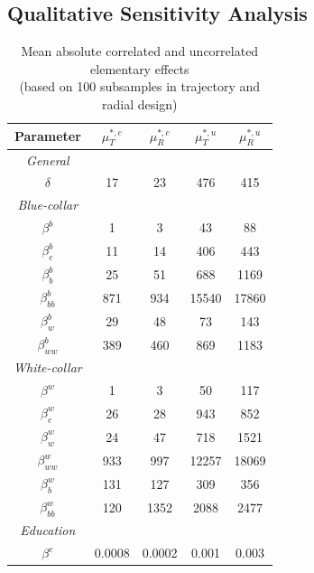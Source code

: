 \documentclass[a4paper,12pt]{article}
\begin{document}
\subsection{Qualitative Sensitivity Analysis}
\newpage
\setlength{\tabcolsep}{22pt} %
\begin{table}[H] 
	\centering
	\begin{threeparttable}
		\caption[Model Parametrization]{Mean absolute correlated and uncorrelated elementary effects\\ (based on 100 subsamples in trajectory and radial design)}
		\label{tab:params}
		\renewcommand{\arraystretch}{1.2}%
		\begin{tabular}{cS[table-format=3.2]S[table-format=3.2]@{\hskip 0.7in}|@{\hskip 0.5in}S[table-format=3.2]S[table-format=3.2]}

			{Parameter}     & {$\mu^{*,c}_T$}   & {$\mu^{*,c}_R$} & {$\mu^{*,u}_T$} & {$\mu^{*,u}_R$}\\ \midrule
			\textit{General} \\
			$\delta$ & 17   & 23 & 476 & 415   \\    \midrule
			\textit{Blue-collar}\\    
			$\beta^b$ & 1   & 3            & 43 & 88    \\
			$\beta_e^b$ & 11  &    14        & 406  & 443    \\
			$\beta^b_b$ & 25  & 51            & 688  & 1169    \\
			$\beta^b_{bb}$ & 871 & 934           & 15540  & 17860     \\
			$\beta^b_w$ & 29    & 48             & 73  &  143  \\
			$\beta^b_{ww}$ & 389    & 460           & 869 &  1183    \\ \midrule
			\textit{White-collar}\\
			$\beta^w$ & 1   & 3            & 50 &  117   \\
			$\beta^w_e$ & 26   & 28          & 943 &  852    \\
			$\beta^w_w$ & 24  & 47            & 718 &  1521   \\
			$\beta^w_{ww}$ & 933  & 997           & 12257 & 18069   \\
			$\beta^w_b$ & 131 & 127           & 309 &  356   \\
			$\beta^w_{bb}$ & 120 & 1352         & 2088 &  2477   \\ \midrule
			\textit{Education} \\
			$\beta^e$     & 0.0008    & 0.0002              & 0.001&  0.003   \\

\end{tabular}
\end{threeparttable}
\end{table}
\end{document}
